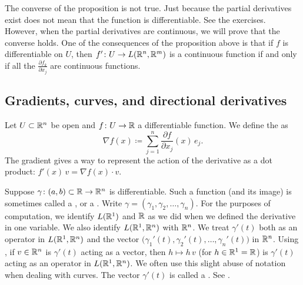 The converse of the proposition is not true.  Just because the partial
derivatives exist does not mean that the function is differentiable.  See
the exercises.
However, when the partial derivatives are continuous, we will prove that the
converse holds.
One of the consequences of the proposition above is that if $f$
is differentiable on $U$, then $f' \colon U \to
L({\mathbb{R}}^n,{\mathbb{R}}^m)$ is a continuous function if and only if
all the $\frac{\partial f_k}{\partial x_j}$ are continuous functions.

\subsection{Gradients, curves, and directional derivatives}

Let $U \subset {\mathbb{R}}^n$ be open and $f \colon U \to {\mathbb{R}}$ a differentiable
function.  We define
the \emph{} as
\begin{equation*}
\nabla f (x) \coloneqq \sum_{j=1}^n \frac{\partial f}{\partial x_j} (x)\, e_j .
\end{equation*}
The gradient gives a way to represent the action of
the derivative as a dot product: $f'(x)\,v = \nabla f(x) \cdot v$.

Suppose $\gamma \colon (a,b) \subset {\mathbb{R}} \to {\mathbb{R}}^n$ is differentiable.
Such a function (and its image) is sometimes called a \emph{},
or a \emph{}.
Write $\gamma =
(\gamma_1,\gamma_2,\ldots,\gamma_n)$.
For the purposes of computation,
we identify $L({\mathbb{R}}^1)$ and ${\mathbb{R}}$ as we did when we defined the
derivative in one variable.
We also identify $L({\mathbb{R}}^1,{\mathbb{R}}^n)$ with ${\mathbb{R}}^n$.
We treat $\gamma'(t)$ both as an operator in
$L({\mathbb{R}}^1,{\mathbb{R}}^n)$ and the vector
$\bigl(\gamma_1'(t),\gamma_2'(t),\ldots,\gamma_n'(t)\bigr)$
in ${\mathbb{R}}^n$.
Using ,
if $v\in {\mathbb{R}}^n$ is $\gamma'(t)$ acting as a vector,
then $h \mapsto h \, v$ (for $h \in {\mathbb{R}}^1 = {\mathbb{R}}$) is
$\gamma'(t)$ acting as an operator
in $L({\mathbb{R}}^1,{\mathbb{R}}^n)$.
We often use this 
slight abuse of notation when dealing with curves.
The vector $\gamma'(t)$ is called a \emph{}.
See .
\begin{myfigureht}
\caption{Differentiable curve and its derivative as a
vector (for clarity assuming $\gamma$ defined on $[a,b]$).
The tangent vector $\gamma'(t)$ points along the curve.\label{fig:difcurveder}}
\end{myfigureht}

